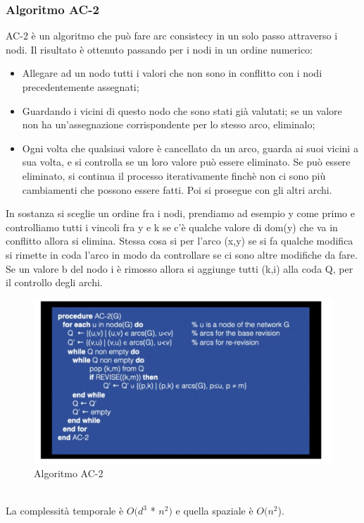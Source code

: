\subsubsection{Algoritmo AC-2}
AC-2 è un algoritmo che può fare arc consistecy in un solo passo attraverso i nodi. Il risultato è ottenuto passando per i nodi in un ordine numerico:
\begin{itemize}
    \item Allegare ad un nodo tutti i valori che non sono in conflitto con i nodi precedentemente assegnati;
    \item Guardando i vicini di questo nodo che sono stati già valutati; se un valore non ha un’assegnazione corrispondente per lo stesso arco, eliminalo;
    \item Ogni volta che qualsiasi valore è cancellato da un arco, guarda ai suoi vicini a sua volta, e si controlla se un loro valore può essere eliminato. Se può essere eliminato, si continua il processo iterativamente finchè non ci sono più cambiamenti che possono essere fatti. Poi si prosegue con gli altri archi.
\end{itemize}
In sostanza si sceglie un ordine fra i nodi, prendiamo ad esempio y come primo e controlliamo tutti i vincoli fra y e k se c’è qualche valore di dom(y) che va in conflitto allora si elimina. Stessa cosa si per l’arco (x,y) se si fa qualche modifica si rimette in coda l’arco in modo da controllare se ci sono altre modifiche da fare. Se un valore b del nodo i è rimosso allora si aggiunge tutti (k,i) alla coda Q, per il controllo degli archi.
\begin{figure}[htp]
	\centering
    \includegraphics[width=13cm, keepaspectratio]{img/Cap3/ac-2.png}
    \caption{Algoritmo AC-2}
\end{figure}
\\La complessità temporale è $O(d^3$ * $n^2)$ e quella spaziale è $O(n^2$).
\newpage
